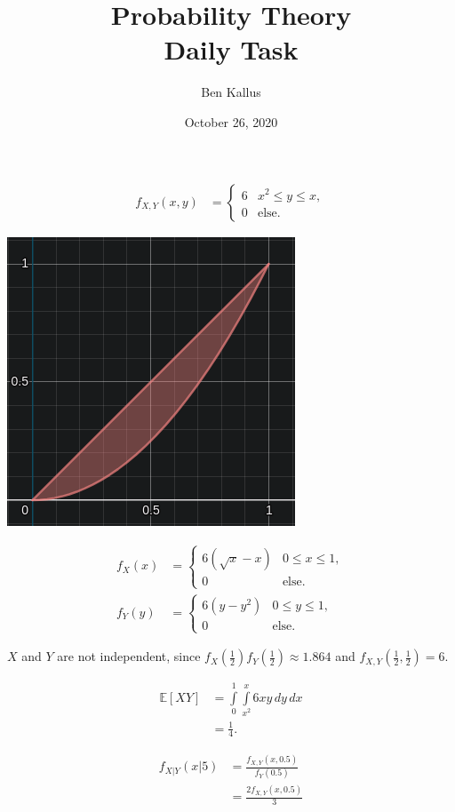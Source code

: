 \documentclass[12pt]{article}
\title{Probability Theory \\ Daily Task}
\author{Ben Kallus}
\date{October 26, 2020}
\begin{document}
\color{white}
\pagecolor{black}
\maketitle

\begin{align*}
    f_{X,Y}(x,y) &= \begin{cases} 6 & x^2 \leq y \leq x, \\ 0 & \text{else.} \end{cases}
\end{align*}

\begin{center}
    \includegraphics{capture0.png}
\end{center}

\medskip
{}
\begin{align*}
    f_X(x) &= \begin{cases} 6(\sqrt x - x) & 0 \leq x \leq 1, \\ 0 & \text{else.} \end{cases} \\
    f_Y(y) &= \begin{cases} 6(y - y^2) & 0 \leq y \leq 1, \\ 0 & \text{else.} \end{cases}
\end{align*}

$X$ and $Y$ are not independent, since $f_X(\frac12)f_Y(\frac12) \approx 1.864$ and $f_{X,Y}(\frac12, \frac12) = 6$.

\medskip
{}
\begin{align*}
    \mathbb E[XY] &= \int\limits_{0}^1 \int\limits_{x^2}^x 6xy \,dy \,dx \\
                  &= \frac14.
\end{align*}

\medskip
{}
\begin{align*}
    f_{X|Y}(x|5) &= \frac{f_{X,Y}(x,0.5)}{f_Y(0.5)} \\
                 &= \frac{2f_{X,Y}(x,0.5)}{3}
\end{align*}
\end{document}
